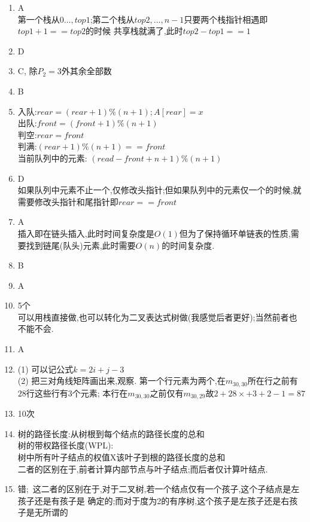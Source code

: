 \documentclass[12pt, a4paper, oneside, UTF8]{ctexbook}
\begin{document}
\begin{enumerate}[label=\arabic*.\textbf{答案}:]
    \item A \\
    第一个栈从$0\ldots,top1$;第二个栈从$top2,\ldots,n-1$只要两个栈指针相遇即$top1+1==top2$的时候
    共享栈就满了,此时$top2-top1==1$ 

    \item D 

    \item C, 除$P_2=3$外其余全部数 
    \item B
    \item   
    入队:$rear=(rear+1)\% (n+1); A[rear]=x$ \\
    出队:$front=(front+1)\%(n+1)$ \\
    判空:$rear=front$ \\
    判满:$(rear+1)\%(n+1)==front$\\
    当前队列中的元素: $(read-front+n+1)\%(n+1)$
    \item D \\
    如果队列中元素不止一个,仅修改头指针;但如果队列中的元素仅一个的时候,就需要修改头指针和尾指针即$rear==front$
    \item A \\ 
    插入即在链头插入,此时时间复杂度是$O(1)$但为了保持循环单链表的性质,需要找到链尾(队头)元素,此时需要$O(n)$的时间复杂度.
    \item B 
    \item A
    \item 5个 \\
    可以用栈直接做,也可以转化为二叉表达式树做(我感觉后者更好);当然前者也不能不会.
    \item A
    \item 
    (1) 可以记公式$k=2i+j-3$ \\
    (2) 把三对角线矩阵画出来,观察. 第一个行元素为两个,在$m_{30,30}$所在行之前有$28$行这些行有3个元素;
    本行在$m_{30,30}$之前仅有$m_{30,29}$故$2+28\times+3+2 - 1 = 87$
    \item 10次
    \item 
    树的路径长度:从树根到每个结点的路径长度的总和 \\
    树的带权路径长度(WPL):\\
    树中所有叶子结点的权值X该叶子到根的路径长度的总和 \\
    二者的区别在于,前者计算内部节点与叶子结点;而后者仅计算叶结点.
    \item 
    错;\ 这二者的区别在于,对于二叉树,若一个结点仅有一个孩子,这个子结点是左孩子还是有孩子是
    确定的;而对于度为2的有序树,这个孩子是左孩子还是右孩子是无所谓的 \\

\end{enumerate}
\end{document}
